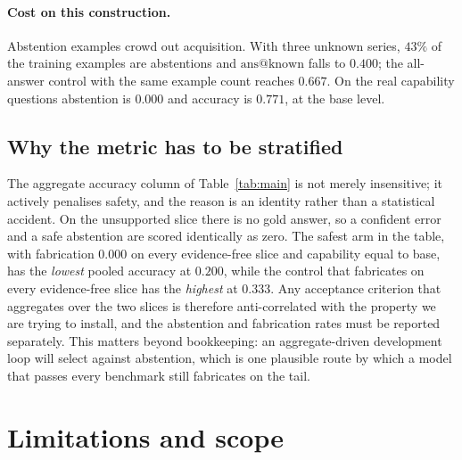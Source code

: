 \documentclass[11pt,a4paper]{article}
\begin{document}
\paragraph{Cost on this construction.}
Abstention examples crowd out acquisition. With three unknown series, $43\%$ of
the training examples are abstentions and $\mathrm{ans}@\text{known}$ falls to
$0.400$; the all-answer control with the same example count reaches $0.667$.
On the real capability questions abstention is $0.000$ and accuracy is $0.771$,
at the base level.

\subsection{Why the metric has to be stratified}
\label{sec:pooled}

The aggregate accuracy column of Table~\ref{tab:main} is not merely
insensitive; it actively penalises safety, and the reason is an identity rather
than a statistical accident. On the unsupported slice there is no gold answer,
so a confident error and a safe abstention are scored identically as zero. The
safest arm in the table, with fabrication $0.000$ on every evidence-free slice
and capability equal to base, has the \emph{lowest} pooled accuracy at $0.200$,
while the control that fabricates on every evidence-free slice has the
\emph{highest} at $0.333$. Any acceptance criterion that aggregates over the
two slices is therefore anti-correlated with the property we are trying to
install, and the abstention and fabrication rates must be reported separately.
This matters beyond bookkeeping: an aggregate-driven development loop will
select against abstention, which is one plausible route by which a model that
passes every benchmark still fabricates on the tail.

\section{Limitations and scope}
\label{sec:limits}
\end{document}
